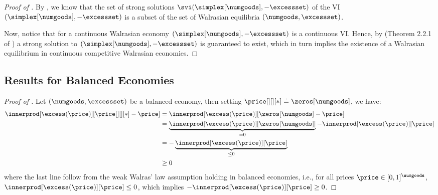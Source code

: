 \thmexistencewe*
\begin{proof}[Proof of ]
    By , we know that the set of strong solutions $\svi(\simplex[\numgoods], -\excessset)$ of the VI $(\simplex[\numgoods], -\excessset)$ is a subset of the set of Walrasian equilibria $(\numgoods, \excessset)$.

    Now, notice that for a continuous Walrasian economy $(\simplex[\numgoods], -\excessset)$ is a continuous VI. Hence, by (Theorem 2.2.1 of \citet{facchinei2003finite}) a strong solution to $(\simplex[\numgoods], -\excessset)$ is guaranteed to exist, which in turn implies the existence of a Walrasian equilibrium in continuous competitive Walrasian economies.
\end{proof}

\subsection{Results for Balanced Economies}

\lemmabalancedisminty*
\begin{proof}[Proof of ]

    Let $(\numgoods, \excessset)$ be a balanced economy, then setting $\price[][][*] \doteq \zeros[\numgoods]$, we have:
    \begin{align*}
        \innerprod[{ \excess(\price)}][{\price[][][*] - \price}] &= \innerprod[{ \excess(\price)}][{\zeros[\numgoods] - \price}]\\
        &= \underbrace{\innerprod[{ \excess(\price)}][{\zeros[\numgoods]}]}_{= 0} - \innerprod[{ \excess(\price)}][{\price}]\\
        &= - \underbrace{\innerprod[{ \excess(\price)}][{\price}]}_{\leq 0}\\
        &\geq 0
    \end{align*}
    where the last line follow from the weak Walras' law assumption holding in balanced economies, i.e., for all prices $\price \in [0, 1]^\numgoods$, $\innerprod[{ \excess(\price)}][{\price}] \leq 0$, which implies $-\innerprod[{ \excess(\price)}][{\price}] \geq 0$. 
\end{proof}




